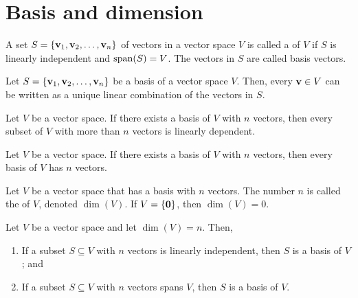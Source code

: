 \section{Basis and dimension}

\begin{defn}
A set $ S=\{\mathbf{v}_1,\mathbf{v}_2,\ldots,\mathbf{v}_n\} $ of vectors in a vector space $ V $ is called a  of $ V $ if $ S $ is linearly independent and $ \operatorname{span}(S)=V $. The vectors in $ S $ are called basis vectors.
\end{defn}

\begin{thm}
Let $ S=\{\mathbf{v}_1,\mathbf{v}_2,\ldots,\mathbf{v}_n\} $ be a basis of a vector space $ V $. Then, every $ \mathbf{v}\in V $ can be written as a unique linear combination of the vectors in $ S $.
\end{thm}

\begin{thm}
Let $ V $ be a vector space. If there exists a basis of $ V $ with $ n $ vectors, then every subset of $ V $ with more than $ n $ vectors is linearly dependent.
\end{thm}

\begin{cor}
Let $ V $ be a vector space. If there exists a basis of $ V $ with $ n $ vectors, then every basis of $ V $ has $ n $ vectors.
\end{cor}

\begin{defn}
Let $ V $ be a vector space that has a basis with $ n $ vectors. The number $ n $ is called the  of $ V $, denoted $ \dim(V) $. If $ V=\{\mathbf{0}\} $, then $ \dim(V)=0 $.
\end{defn}

\begin{thm}
Let $ V $ be a vector space and let $ \dim(V)=n $. Then,
\begin{enumerate}
    \item If a subset $ S\subseteq V $ with $ n $ vectors is linearly independent, then $ S $ is a basis of $ V $; and
    \item If a subset $ S\subseteq V $ with $ n $ vectors spans $ V $, then $ S $ is a basis of $ V $.
\end{enumerate}
\end{thm}